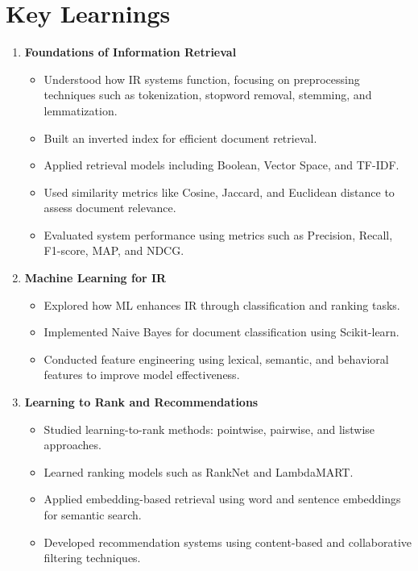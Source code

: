 \documentclass[12pt,a4paper]{article}
\begin{document}
\newpage
\section{Key Learnings}
\begin{enumerate}
    \item \textbf{Foundations of Information Retrieval}
    \begin{itemize}
        \item Understood how IR systems function, focusing on preprocessing techniques such as tokenization, stopword removal, stemming, and lemmatization.
        \item Built an inverted index for efficient document retrieval.
        \item Applied retrieval models including Boolean, Vector Space, and TF-IDF.
        \item Used similarity metrics like Cosine, Jaccard, and Euclidean distance to assess document relevance.
        \item Evaluated system performance using metrics such as Precision, Recall, F1-score, MAP, and NDCG.
    \end{itemize}
    
    \item \textbf{Machine Learning for IR}
    \begin{itemize}
        \item Explored how ML enhances IR through classification and ranking tasks.
        \item Implemented Naive Bayes for document classification using Scikit-learn.
        \item Conducted feature engineering using lexical, semantic, and behavioral features to improve model effectiveness.
    \end{itemize}
    
    \item \textbf{Learning to Rank and Recommendations}
    \begin{itemize}
        \item Studied learning-to-rank methods: pointwise, pairwise, and listwise approaches.
        \item Learned ranking models such as RankNet and LambdaMART.
        \item Applied embedding-based retrieval using word and sentence embeddings for semantic search.
        \item Developed recommendation systems using content-based and collaborative filtering techniques.
    \end{itemize}
    

\end{enumerate}
\end{document}
